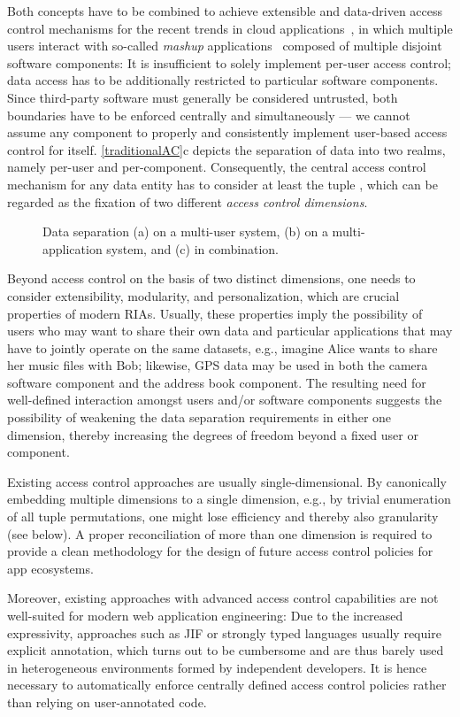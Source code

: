 \documentclass{src/acm_proc_article-sp} \else
\def \mathtxt #1{}
\def \fig #1#2#3#4{\begin{figure}[tp]\centering\epsfig{trim=#2, clip=true, width=#3\textwidth, file=res/#1.eps}\vspace{-3mm}\caption{#4\vspace{-3mm}}\label{#1}\end{figure}}
\begin{document}
Both concepts have to be combined to achieve extensible and
data-driven access control mechanisms for the recent trends
in cloud applications~\cite{Wang2009:Convergence}, in which
multiple users interact with so-called \emph{mashup}
applications~\cite{Hagemann:2010Mashups} composed of
multiple disjoint software components: It is insufficient to
solely implement per-user access control; data access has to
be additionally restricted to particular software
components. Since third-party software must generally be
considered untrusted, both boundaries have to be enforced
centrally and simultaneously --- we cannot assume any
component to properly and consistently implement user-based
access control for itself.
\autoref{traditionalAC}c depicts the separation of data into two
realms, namely per-user and per-component. Consequently, the central
access control mechanism for any data entity  has to consider at
least the tuple \mathtxt{(uid, cid)}, which can be regarded as the
fixation of two different \emph{access control dimensions}.
\fig{traditionalAC}{0px 0px 0px 0px}{0.98}{Data separation (a) on a
multi-user system, (b) on a multi-application system, and (c) in
combination.}


Beyond access control on the basis of two distinct
dimensions, one needs to consider extensibility, modularity,
and personalization, which are crucial properties of modern
RIAs. Usually, these properties imply the possibility of
users who may want to share their own data and particular
applications that may have to jointly operate on the same
datasets, e.g., imagine Alice wants to share her music files with
Bob; likewise, GPS data may be used in both the camera
software component and the address book component. The
resulting need for well-defined interaction amongst users
and/or software components suggests the possibility of
weakening the data separation requirements in either one
dimension, thereby increasing the degrees of freedom beyond
a fixed user or component.


Existing access control approaches are usually
single-dim\-en\-sional. By canonically embedding multiple
dimensions to a single dimension, e.g., by trivial
enumeration of all tuple permutations, one might lose
efficiency and thereby also granularity (see below). A
proper reconciliation of more than one dimension is required
to provide a clean methodology for the design of future
access control policies for app ecosystems.


Moreover, existing approaches with advanced access control
capabilities are not well-suited for modern
web application engineering: Due to the increased
expressivity, approaches such as JIF \cite{Myers1999:JFlow}
or strongly typed languages
\cite{Volpano1996:TypeSystemFlowAnalysis,Fournet:2005:A-Type-Dis,Jia2008:AURA}
usually require explicit annotation, which turns out to be
cumbersome and are thus barely used in heterogeneous
environments formed by independent developers. It is hence
necessary to automatically enforce centrally defined access
control policies rather than relying on user-annotated code.
\end{document}
